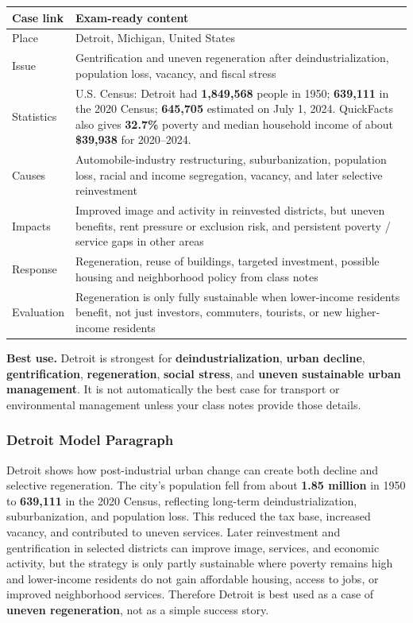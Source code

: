 \documentclass[11pt,a4paper]{article}
\newcommand{\term}[1]{\textcolor{HeadingBlue}{\textbf{#1}}}
\newcommand{\boxnote}[3]{%
\noindent\colorbox{#1}{%
  \begin{minipage}{0.965\textwidth}
  \sffamily
  \textbf{\textcolor{HeadingBlue}{#2}} #3
  \end{minipage}
}}
\begin{document}
\begin{tabularx}{\textwidth}{L{0.18\textwidth}Y}
\toprule
\textbf{Case link} & \textbf{Exam-ready content} \\
\midrule
Place & Detroit, Michigan, United States \\
Issue & Gentrification and uneven regeneration after deindustrialization,
population loss, vacancy, and fiscal stress \\
Statistics & U.S. Census: Detroit had \term{1,849,568} people in 1950;
\term{639,111} in the 2020 Census; \term{645,705} estimated on July 1, 2024.
QuickFacts also gives \term{32.7\%} poverty and median household income of
about \term{\$39,938} for 2020--2024. \\
Causes & Automobile-industry restructuring, suburbanization, population loss,
racial and income segregation, vacancy, and later selective reinvestment \\
Impacts & Improved image and activity in reinvested districts, but uneven
benefits, rent pressure or exclusion risk, and persistent poverty / service
gaps in other areas \\
Response & Regeneration, reuse of buildings, targeted investment, possible
housing and neighborhood policy from class notes \\
Evaluation & Regeneration is only fully sustainable when lower-income
residents benefit, not just investors, commuters, tourists, or new
higher-income residents \\
\bottomrule
\end{tabularx}

\boxnote{SoftGreen}{Best use.}{Detroit is strongest for
\term{deindustrialization}, \term{urban decline}, \term{gentrification},
\term{regeneration}, \term{social stress}, and \term{uneven sustainable urban
management}. It is not automatically the best case for transport or
environmental management unless your class notes provide those details.}

\subsubsection{Detroit Model Paragraph}

Detroit shows how post-industrial urban change can create both decline and
selective regeneration. The city's population fell from about \term{1.85
million} in 1950 to \term{639,111} in the 2020 Census, reflecting long-term
deindustrialization, suburbanization, and population loss. This reduced the tax
base, increased vacancy, and contributed to uneven services. Later
reinvestment and gentrification in selected districts can improve image,
services, and economic activity, but the strategy is only partly sustainable
where poverty remains high and lower-income residents do not gain affordable
housing, access to jobs, or improved neighborhood services. Therefore Detroit
is best used as a case of \term{uneven regeneration}, not as a simple success
story.
\end{document}
